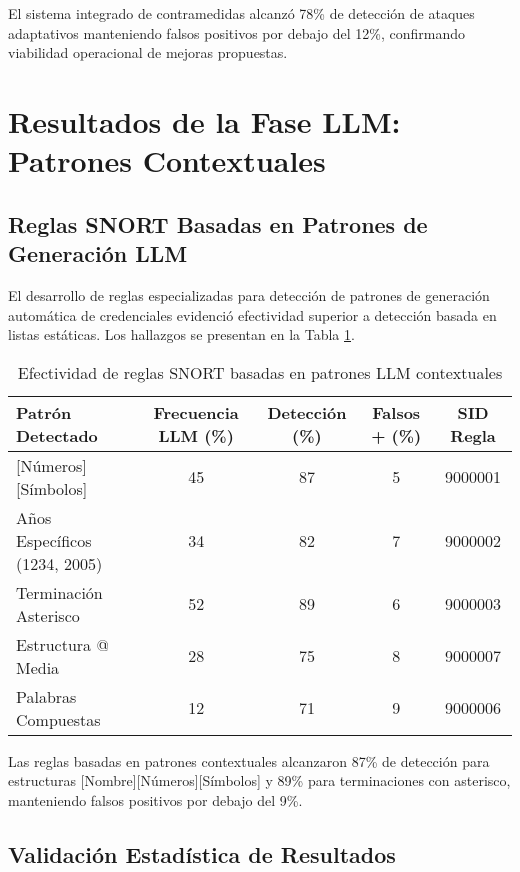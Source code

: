 El sistema integrado de contramedidas alcanzó 78\% de detección de ataques adaptativos manteniendo falsos positivos por debajo del 12\%, confirmando viabilidad operacional de mejoras propuestas.

\section{Resultados de la Fase LLM: Patrones Contextuales}

\subsection{Reglas SNORT Basadas en Patrones de Generación LLM}

El desarrollo de reglas especializadas para detección de patrones de generación automática de credenciales evidenció efectividad superior a detección basada en listas estáticas. Los hallazgos se presentan en la Tabla \ref{tab:llm_pattern_rules}.

\begin{table}[h]
\centering
\caption{Efectividad de reglas SNORT basadas en patrones LLM contextuales}
\label{tab:llm_pattern_rules}
\begin{tabular}{|l|c|c|c|c|}
\hline
\textbf{Patrón Detectado} & \textbf{Frecuencia LLM (\%)} & \textbf{Detección (\%)} & \textbf{Falsos + (\%)} & \textbf{SID Regla} \\
\hline
[Nombre][Números][Símbolos] & 45 & 87 & 5 & 9000001 \\
\hline
Años Específicos (1234, 2005) & 34 & 82 & 7 & 9000002 \\
\hline
Terminación Asterisco & 52 & 89 & 6 & 9000003 \\
\hline
Estructura @ Media & 28 & 75 & 8 & 9000007 \\
\hline
Palabras Compuestas & 12 & 71 & 9 & 9000006 \\
\hline
\end{tabular}
\end{table}

Las reglas basadas en patrones contextuales alcanzaron 87\% de detección para estructuras [Nombre][Números][Símbolos] y 89\% para terminaciones con asterisco, manteniendo falsos positivos por debajo del 9\%.

\subsection{Validación Estadística de Resultados}

